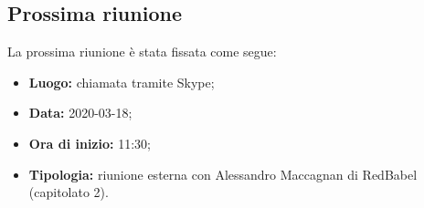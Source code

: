 	\subsection{Prossima riunione}
		La prossima riunione è stata fissata come segue: 
		\begin{itemize}
			\item \textbf{Luogo: } chiamata tramite Skype; 
			\item \textbf{Data: } 2020-03-18; 
			\item \textbf{Ora di inizio: } 11:30;
			\item \textbf{Tipologia: } riunione esterna con Alessandro Maccagnan di RedBabel (capitolato 2).
		\end{itemize}